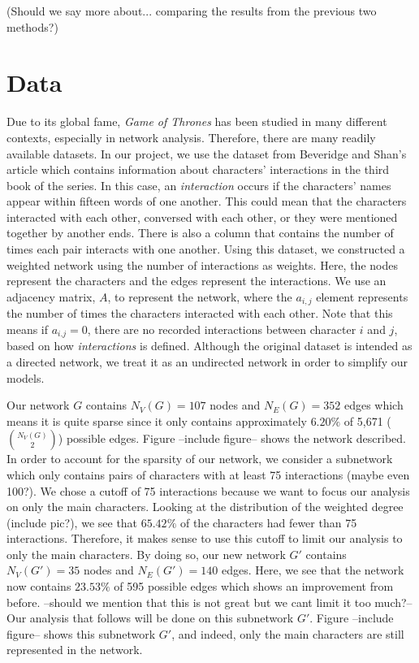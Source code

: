 \documentclass{article}
\begin{document}
(Should we say more about... comparing the results from the previous two methods?) 

\section{Data}
Due to its global fame, \textit{Game of Thrones}  has been studied in many different contexts, especially in network analysis. Therefore, there are many readily available datasets. In our project, we use the dataset from Beveridge and Shan's \cite{beveridge2016network} article which contains information about characters' interactions in the third book of the series. In this case, an \textit{interaction} occurs if the characters' names appear within fifteen words of one another. This could mean that the characters interacted with each other, conversed with each other, or they were mentioned together by another ends. There is also a column that contains the number of times each pair interacts with one another. Using this dataset, we constructed a weighted network using the number of interactions as weights. Here, the nodes represent the characters and the edges represent the interactions. We use an adjacency matrix, $A$, to represent the network, where the $a_{i,j}$ element represents the number of times the characters interacted with each other. Note that this means if $a_{i.j} = 0$, there are no recorded interactions between character $i$ and $j$, based on how \textit{interactions} is defined. Although the original dataset is intended as a directed network, we treat it as an undirected network in order to simplify our models. 

Our network $G$ contains $N_V(G) = 107$ nodes and $N_E(G) = 352$ edges which means it is quite sparse since it only contains approximately $6.20\%$ of 5,671 ($N_V(G) \choose 2$) possible edges. Figure --include figure-- shows the network described. In order to account for the sparsity of our network, we consider a subnetwork which only contains pairs of characters with at least 75 interactions (maybe even 100?). We chose a cutoff of 75 interactions because we want to focus our analysis on only the main characters. Looking at the distribution of the weighted degree (include pic?), we see that $65.42\%$ of the characters had fewer than 75 interactions. Therefore, it makes sense to use this cutoff to limit our analysis to only the main characters. By doing so, our new network $G'$ contains $N_V(G') = 35$ nodes and $N_E(G') = 140$ edges. Here, we see that the network now contains $23.53\%$ of 595 possible edges which shows an improvement from before. --should we mention that this is not great but we cant limit it too much?-- Our analysis that follows will be done on this subnetwork $G'$. Figure --include figure-- shows this subnetwork $G'$, and indeed, only the main characters are still represented in the network. 
\end{document}
